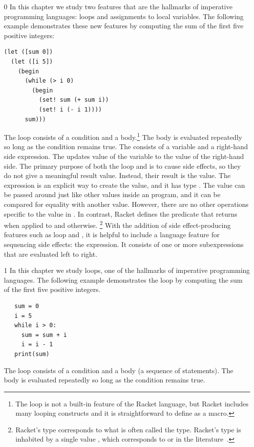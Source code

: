 \documentclass[7x10]{TimesAPriori_MIT}%
\def\racketEd{0}
\def\pythonEd{1}
\def\edition{1}
\newcommand{\pythonColor}[0]{}
\numberwithin{theorem}{chapter}
\numberwithin{definition}{chapter}
\numberwithin{equation}{chapter}
\begin{document}
{\if\edition\racketEd
%
In this chapter we study two features that are the hallmarks of
imperative programming languages: loops and assignments to local
variables. The following example demonstrates these new features by
computing the sum of the first five positive integers:
\begin{lstlisting}
(let ([sum 0])
  (let ([i 5])
    (begin
      (while (> i 0)
        (begin
          (set! sum (+ sum i))
          (set! i (- i 1))))
      sum)))
\end{lstlisting}
The  loop consists of a condition and a
body.\footnote{The  loop is not a built-in
feature of the Racket language, but Racket includes many looping
constructs and it is straightforward to define  as a
macro.} The body is evaluated repeatedly so long as the condition
remains true.
%
The  consists of a variable and a right-hand side
expression.  The  updates value of the variable to the
value of the right-hand side.
%
The primary purpose of both the  loop and  is
to cause side effects, so they do not give a meaningful result
value. Instead, their result is the  value.  The
expression  is an explicit way to create the
 value, and it has type .  The
 value can be passed around just like other values
inside an \LangLoop{} program, and it can be compared for equality with
another  value. However, there are no other operations
specific to the  value in \LangLoop{}. In contrast,
Racket defines the   predicate that returns 
when applied to  and  otherwise.%
%
\footnote{Racket's  type corresponds to what is often
  called the  type. Racket's  type is inhabited
  by a single value , which corresponds to 
  or \code{()} in the literature~\citep{Pierce:2002hj}.}
%
With the addition of side effect-producing features such as
 loop and , it is helpful to include a language
feature for sequencing side effects: the  expression. It
consists of one or more subexpressions that are evaluated
left to right.
%
\fi}

{\if\edition\pythonEd\pythonColor
%
In this chapter we study loops, one of the hallmarks of imperative
programming languages. The following example demonstrates the
 loop by computing the sum of the first five positive
integers.
\begin{lstlisting}
   sum = 0
   i = 5
   while i > 0:
     sum = sum + i
     i = i - 1
   print(sum)
\end{lstlisting}
The  loop consists of a condition and a body (a sequence
of statements). The body is evaluated repeatedly so long as the
condition remains true.
%
\fi}
\end{document}
